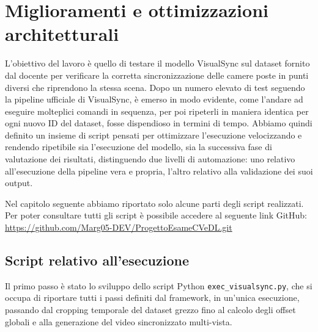 \graphicspath{{chapters/chapter4/img}}
\chapter{Miglioramenti e ottimizzazioni architetturali} \label{miglioramenti}
L'obiettivo del lavoro è quello di testare il modello VisualSync sul dataset fornito dal docente per verificare la corretta sincronizzazione delle camere poste in punti diversi che riprendono la stessa scena. Dopo un numero elevato di test seguendo la pipeline ufficiale di VisualSync, è emerso in modo evidente, come l'andare ad eseguire molteplici comandi in sequenza, per poi ripeterli in maniera identica per ogni nuovo ID del dataset, fosse dispendioso in termini di tempo. Abbiamo quindi definito un insieme di script pensati per ottimizzare l'esecuzione velocizzando e rendendo ripetibile sia l'esecuzione del modello, sia la successiva fase di valutazione dei risultati, distinguendo due livelli di automazione: uno relativo all'esecuzione della pipeline vera e propria, l'altro relativo alla validazione dei suoi output.

Nel capitolo seguente abbiamo riportato solo alcune parti degli script realizzati. Per poter consultare tutti gli script è possibile accedere al seguente link GitHub: 
\url{https://github.com/Marg05-DEV/ProgettoEsameCVeDL.git}


\section{Script relativo all'esecuzione}
Il primo passo è stato lo sviluppo dello script Python \texttt{exec\_visualsync.py}, che si occupa di riportare tutti i passi definiti dal framework, in un'unica esecuzione, passando dal cropping temporale del dataset grezzo fino al calcolo degli offset globali e alla generazione del video sincronizzato multi-vista.

